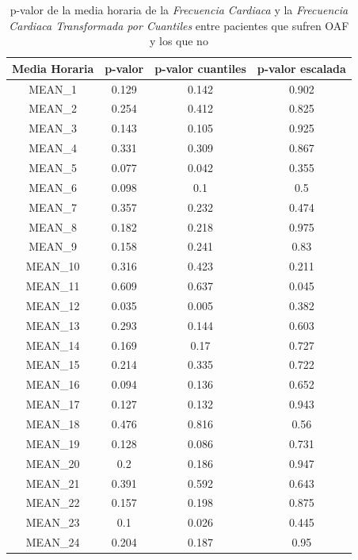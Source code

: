 \begin{table}[H]
    \centering
    \begin{tabular}{|c|c|c|c|}
        \hline
        \textbf{Media Horaria} & \textbf{p-valor} & \textbf{p-valor 
        cuantiles} & \textbf{p-valor 
        escalada} \\
        \hline
        MEAN\_1 & 0.129 & 0.142 & 0.902 \\
        MEAN\_2 & 0.254 & 0.412 & 0.825 \\
        MEAN\_3 & 0.143 & 0.105 & 0.925 \\
        MEAN\_4 & 0.331 & 0.309 & 0.867 \\
        MEAN\_5 & 0.077 & 0.042 & 0.355 \\
        MEAN\_6 & 0.098 & 0.1 & 0.5 \\
        MEAN\_7 & 0.357 & 0.232 & 0.474 \\
        MEAN\_8 & 0.182 & 0.218 & 0.975 \\
        MEAN\_9 & 0.158 & 0.241 & 0.83 \\
        MEAN\_10 & 0.316 & 0.423 & 0.211 \\
        MEAN\_11 & 0.609 & 0.637 & 0.045 \\
        MEAN\_12 & 0.035 & 0.005 & 0.382 \\
        MEAN\_13 & 0.293 & 0.144 & 0.603 \\
        MEAN\_14 & 0.169 & 0.17 & 0.727 \\
        MEAN\_15 & 0.214 & 0.335 & 0.722 \\
        MEAN\_16 & 0.094 & 0.136 & 0.652 \\
        MEAN\_17 & 0.127 & 0.132 & 0.943 \\
        MEAN\_18 & 0.476 & 0.816 & 0.56 \\
        MEAN\_19 & 0.128 & 0.086 & 0.731 \\
        MEAN\_20 & 0.2 & 0.186 & 0.947 \\
        MEAN\_21 & 0.391 & 0.592 & 0.643 \\
        MEAN\_22 & 0.157 & 0.198 & 0.875 \\
        MEAN\_23 & 0.1 & 0.026 & 0.445 \\
        MEAN\_24 & 0.204 & 0.187 & 0.95 \\
        \hline
    \end{tabular}\label{tab:mean-FC}
    \caption{p-valor de la media horaria de la \textit{Frecuencia Cardiaca} y la \textit{Frecuencia Cardiaca Transformada por Cuantiles} entre pacientes que sufren OAF y los que no}
\end{table}

